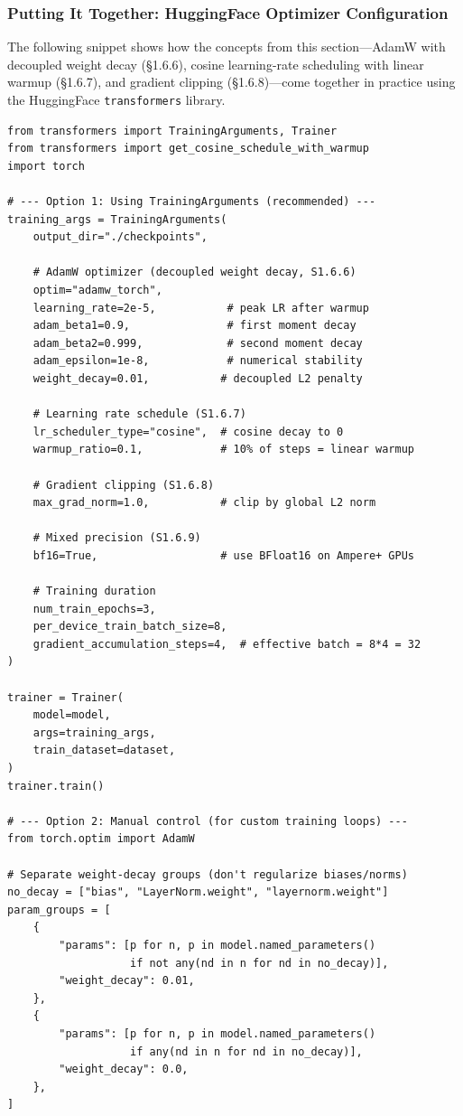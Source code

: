 \subsubsection{Putting It Together: HuggingFace Optimizer Configuration}
\label{putting-it-together-huggingface-optimizer-configuration}

The following snippet shows how the concepts from this section---AdamW with decoupled weight decay (§1.6.6), cosine learning-rate scheduling with linear warmup (§1.6.7), and gradient clipping (§1.6.8)---come together in practice using the HuggingFace \texttt{transformers} library.

\begin{lstlisting}[style=pythonstyle, caption={Complete optimizer configuration combining AdamW -- cosine schedule -- and gradient clipping.}]
from transformers import TrainingArguments, Trainer
from transformers import get_cosine_schedule_with_warmup
import torch

# --- Option 1: Using TrainingArguments (recommended) ---
training_args = TrainingArguments(
    output_dir="./checkpoints",

    # AdamW optimizer (decoupled weight decay, S1.6.6)
    optim="adamw_torch",
    learning_rate=2e-5,           # peak LR after warmup
    adam_beta1=0.9,               # first moment decay
    adam_beta2=0.999,             # second moment decay
    adam_epsilon=1e-8,            # numerical stability
    weight_decay=0.01,           # decoupled L2 penalty

    # Learning rate schedule (S1.6.7)
    lr_scheduler_type="cosine",  # cosine decay to 0
    warmup_ratio=0.1,            # 10% of steps = linear warmup

    # Gradient clipping (S1.6.8)
    max_grad_norm=1.0,           # clip by global L2 norm

    # Mixed precision (S1.6.9)
    bf16=True,                   # use BFloat16 on Ampere+ GPUs

    # Training duration
    num_train_epochs=3,
    per_device_train_batch_size=8,
    gradient_accumulation_steps=4,  # effective batch = 8*4 = 32
)

trainer = Trainer(
    model=model,
    args=training_args,
    train_dataset=dataset,
)
trainer.train()

# --- Option 2: Manual control (for custom training loops) ---
from torch.optim import AdamW

# Separate weight-decay groups (don't regularize biases/norms)
no_decay = ["bias", "LayerNorm.weight", "layernorm.weight"]
param_groups = [
    {
        "params": [p for n, p in model.named_parameters()
                   if not any(nd in n for nd in no_decay)],
        "weight_decay": 0.01,
    },
    {
        "params": [p for n, p in model.named_parameters()
                   if any(nd in n for nd in no_decay)],
        "weight_decay": 0.0,
    },
]


\end{lstlisting}
